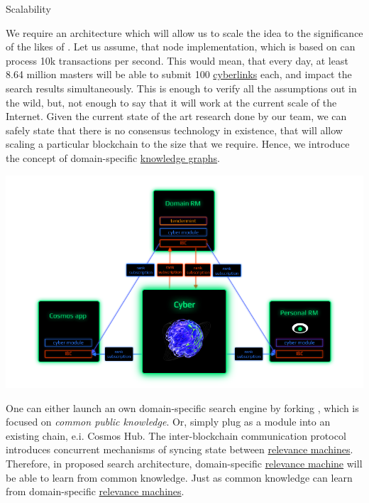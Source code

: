 \documentclass[8pt,oneside]{amsart}
\makeatletter
\newcommand{\linkred}[2]{\href{#1}{\color{red}{#2}}}
\renewcommand\subsection{\@startsection{subsection}
                                    {2}{\z@}
                                    {-3.25ex\@plus -1ex \@minus -.2ex}
                                    {0ex \@plus .2ex}
                                    {\play\Large}
                        }
\newcommand{\titleSection}[1]{\subsection{#1}}
\newenvironment{Figure}
  {\par\medskip\noindent\minipage{\linewidth}}
  {\endminipage\par\medskip}
\makeatother
\begin{document}
\titleSection{Scalability}\label{scalability}

We require an architecture which will allow us to scale the idea to the significance of the likes of \linkred{https://google.com}{Google}. Let us assume, that node implementation, which is based on \linkred{https://github.com/cosmos/cosmos-sdk}{Cosmos-SDK} can process 10k transactions per second. This would mean, that every day, at least 8.64 million masters will be able to submit 100 {\hyperref[cyberlinks]{cyberlinks}} each, and impact the search results simultaneously. This is enough to verify all the assumptions out in the wild, but, not enough to say that it will work at the current scale of the Internet. Given the current state of the art research done by our team, we can safely state that there is no consensus technology in existence, that will allow scaling a particular blockchain to the size that we require. Hence, we introduce the concept of domain-specific {\hyperref[knowledge-graph]{knowledge graphs}}.

\begin{Figure}
    \centering
    \includegraphics[width=1\textwidth]{network.png}
\end{Figure}

One can either launch an own domain-specific search engine by forking \linkred{https://github.com/cybercongress/go-cyber}{go-cyber}, which is focused on \textit{common public knowledge}. Or, simply plug \linkred{https://github.com/cybercongress/go-cyber}{go-cyber} as a module into an existing chain, e.i. Cosmos Hub. The inter-blockchain communication protocol introduces concurrent mechanisms of syncing state between {\hyperref[relevance-machine]{relevance machines}}. Therefore, in proposed search architecture, domain-specific {\hyperref[relevance-machine]{relevance machine}} will be able to learn from common knowledge. Just as common knowledge can learn from domain-specific {\hyperref[relevance-machine]{relevance machines}}.
\end{document}
